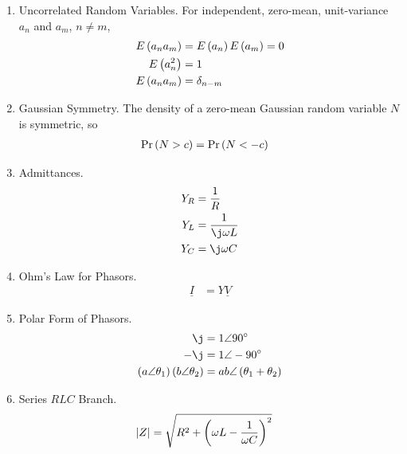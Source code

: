 \begin{enumerate}[label=\thesubsection.\arabic*, ref=\thesubsection.\theenumi]
\begin{align}
p_{X+Y}\brak{k} &= \sum_{i} p_X\brak{i}\, p_Y\brak{k - i}
\label{eq:F-conv-pmf}
\end{align}
\solution The event $\cbrak{X + Y = k}$ is the union over $i$ of the disjoint events $\cbrak{X = i, Y = k - i}$. Hence
\begin{align}
\pr{X + Y = k} &= \sum_{i} \pr{X = i, Y = k - i}
\\
&= \sum_{i} \pr{X = i}\pr{Y = k - i}
\\
&= \sum_{i} p_X\brak{i}\, p_Y\brak{k - i}
\end{align}
upon using \eqref{eq:F-indep}.
\item Uncorrelated Random Variables. For independent, zero-mean, unit-variance $a_n$ and $a_m$, $n \ne m$,
\begin{align}
E\left(a_n a_m\right) &= E\left(a_n\right)E\left(a_m\right) = 0
\\
E\left(a_n^2\right) &= 1
\\
E\left(a_n a_m\right) &= \delta_{n - m}
\label{eq:F-uncorr}
\end{align}
\item Gaussian Symmetry. The density of a zero-mean Gaussian random variable $N$ is symmetric, so
\begin{align}
\Pr\left(N > c\right) &= \Pr\left(N < -c\right)
\label{eq:F-gauss-sym}
\end{align}
\item Admittances.
\begin{align}
Y_R &= \frac{1}{R}
\\
Y_L &= \frac{1}{\j \omega L}
\\
Y_C &= \j \omega C
\label{eq:F-admittance}
\end{align}
\item Ohm's Law for Phasors.
\begin{align}
\underline{I} &= Y \underline{V}
\label{eq:F-phasor-ohm}
\end{align}
\item Polar Form of Phasors.
\begin{align}
\j &= 1 \angle 90^\circ
\\
-\j &= 1 \angle -90^\circ
\\
\brak{a \angle \theta_1}\brak{b \angle \theta_2} &= ab \angle \brak{\theta_1 + \theta_2}
\label{eq:F-polar}
\end{align}
\item Series $RLC$ Branch.
\begin{align}
\abs{Z} &= \sqrt{R^2 + \brak{\omega L - \frac{1}{\omega C}}^2}
\label{eq:F-series-rlc}

\end{align}
\end{enumerate}
